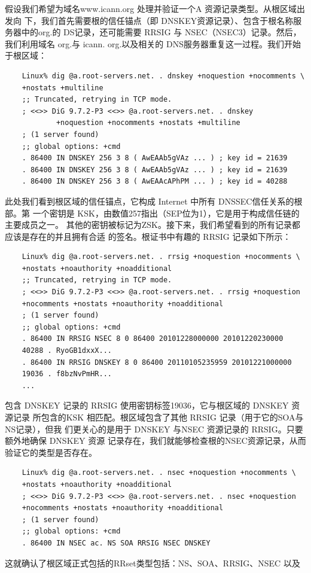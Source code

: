 假设我们希望为域名www.icann.org 处理并验证一个A 资源记录类型。从根区域出发向
下，我们首先需要根的信任锚点（即 DNSKEY资源记录）、包含于根名称服务器中的org.的
DS记录，还可能需要 RRSIG 与 NSEC（NSEC3）记录。然后，我们利用域名 org.与 icann.
org.以及相关的 DNS服务器重复这一过程。我们开始于根区域：
\begin{verbatim}
    Linux% dig @a.root-servers.net. . dnskey +noquestion +nocomments \
    +nostats +multiline
    ;; Truncated, retrying in TCP mode.
    ; <<>> DiG 9.7.2-P3 <<>> @a.root-servers.net. . dnskey
            +noquestion +nocomments +nostats +multiline
    ; (1 server found)
    ;; global options: +cmd
    . 86400 IN DNSKEY 256 3 8 ( AwEAAb5gVAz ... ) ; key id = 21639
    . 86400 IN DNSKEY 256 3 8 ( AwEAAb5gVAz ... ) ; key id = 21639
    . 86400 IN DNSKEY 256 3 8 ( AwEAAcAPhPM ... ) ; key id = 40288
\end{verbatim}
此处我们看到根区域的信任锚点，它构成 Internet 中所有 DNSSEC信任关系的根部。第
一个密钥是 KSK，由数值257指出（SEP位为1），它是用于构成信任链的主要成员之一。
其他的密钥被标记为ZSK。接下来，我们希望看到的所有记录都应该是存在的并且拥有合适
的签名。根证书中有趣的 RRSIG 记录如下所示：
\begin{verbatim}
    Linux% dig @a.root-servers.net. . rrsig +noquestion +nocomments \
    +nostats +noauthority +noadditional
    ;; Truncated, retrying in TCP mode.
    ; <<>> DiG 9.7.2-P3 <<>> @a.root-servers.net. . rrsig +noquestion
    +nocomments +nostats +noauthority +noadditional
    ; (1 server found)
    ;; global options: +cmd
    . 86400 IN RRSIG NSEC 8 0 86400 20101228000000 20101220230000
    40288 . RyoGB1dxxX...
    . 86400 IN RRSIG DNSKEY 8 0 86400 20110105235959 20101221000000
    19036 . f8bzNvPmHR...
    ...
\end{verbatim}
包含 DNSKEY 记录的 RRSIG 使用密钥标签19036，它与根区域的 DNSKEY 资源记录
所包含的KSK 相匹配。根区域包含了其他 RRSIG 记录（用于它的SOA与NS记录），但我
们更关心的是用于 DNSKEY 与NSEC 资源记录的 RRSIG。只要额外地确保 DNSKEY 资源
记录存在，我们就能够检查根的NSEC资源记录，从而验证它的类型是否存在。
\begin{verbatim}
    Linux% dig @a.root-servers.net. . nsec +noquestion +nocomments \
    +nostats +noauthority +noadditional
    ; <<>> DiG 9.7.2-P3 <<>> @a.root-servers.net. . nsec +noquestion
    +nocomments +nostats +noauthority +noadditional
    ; (1 server found)
    ;; global options: +cmd
    . 86400 IN NSEC ac. NS SOA RRSIG NSEC DNSKEY
\end{verbatim}
这就确认了根区域正式包括的RRset类型包括：NS、SOA、RRSIG、NSEC 以及
